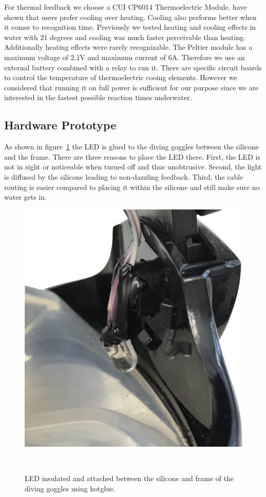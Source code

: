 For thermal feedback we choose a CUI CP6014 Thermoelectric Module. 
\cite{Peiris_thermoVR} have shown that users prefer cooling over heating.
Cooling also performs better when it comes to recognition time.
Previously we tested heating and cooling effects in water with 21 degrees and cooling was much faster perceivable than heating.
Additionally heating effects were rarely recognizable.
The Peltier module has a maximum voltage of 2.1V and maximum current of 6A.
Therefore we use an external battery combined with a relay to run it.
There are specific circuit boards to control the temperature of thermoelectric cooing elements.
However we considered that running it on full power is sufficient for our purpose since we are interested in the fastest possible reaction times underwater.


\subsection{Hardware Prototype}

As shown in figure~\ref{fig:ledcloseup} the LED is glued to the diving goggles between the silicone and the frame.
There are three reasons to place the LED there.
First, the LED is not in sight or noticeable when turned off and thus unobtrusive.
Second, the light is diffused by the silicone leading to non-dazzling feedback.
Third, the cable routing is easier compared to placing it within the silicone and still make sure no water gets in.

\begin{figure}
	\includegraphics[width= \textwidth]{images/LEDcloseupcut.png}
	\caption{LED insulated and attached between the silicone and frame of the diving goggles using hotglue. }~\label{fig:ledcloseup}
\end{figure}

